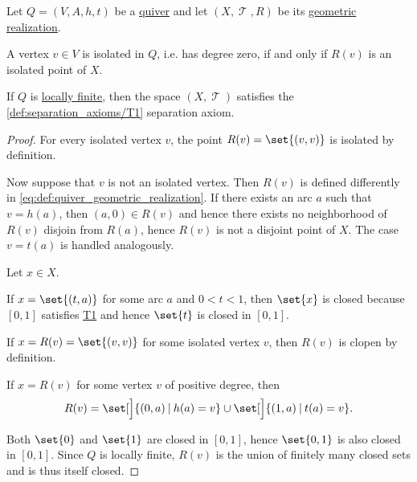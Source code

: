\begin{proposition}\label{thm:def:quiver_geometric_realization/properties}
  Let \( Q = (V, A, h, t) \) be a \hyperref[def:quiver]{quiver} and let \( (X, \mscrT, R) \) be its \hyperref[def:quiver_geometric_realization]{geometric realization}.

  \begin{thmenum}
     A vertex \( v \in V \) is isolated in \( Q \), i.e. has degree zero, if and only if \( R(v) \) is an isolated point of \( X \).

     If \( Q \) is \hyperref[def:hypergraph/degree]{locally finite}, then the space \( (X, \mscrT) \) satisfies the \ref{def:separation_axioms/T1} separation axiom.
  \end{thmenum}
\end{proposition}
\begin{proof}
   For every isolated vertex \( v \), the point \( R(v) = \set{ (v, v) } \) is isolated by definition.

  Now suppose that \( v \) is not an isolated vertex. Then \( R(v) \) is defined differently in \eqref{eq:def:quiver_geometric_realization}. If there exists an arc \( a \) such that \( v = h(a) \), then \( (a, 0) \in R(v) \) and hence there exists no neighborhood of \( R(v) \) disjoin from \( R(a) \), hence \( R(v) \) is not a disjoint point of \( X \). The case \( v = t(a) \) is handled analogously.

   Let \( x \in X \).

  If \( x = \set{ (t, a) } \) for some arc \( a \) and \( 0 < t < 1 \), then \( \set{ x } \) is closed because \( [0, 1] \) satisfies \hyperref[def:separation_axioms/T1]{T1} and hence \( \set{ t } \) is closed in \( [0, 1] \).

  If \( x = R(v) = \set{ (v, v) } \) for some isolated vertex \( v \), then \( R(v) \) is clopen by definition.

  If \( x = R(v) \) for some vertex \( v \) of positive degree, then
  \begin{equation*}
    R(v) = \set[\Big]{ (0, a) \given h(a) = v } \cup \set[\Big]{ (1, a) \given t(a) = v }.
  \end{equation*}

  Both \( \set{ 0 } \) and \( \set{ 1 } \) are closed in \( [0, 1] \), hence \( \set{ 0, 1 } \) is also closed in \( [0, 1] \). Since \( Q \) is locally finite, \( R(v) \) is the union of finitely many closed sets and is thus itself closed.
\end{proof}


